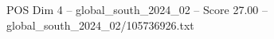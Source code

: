 \begin{textsample}{POS Dim 4 – global\_south\_2024\_02 – Score 27.00 – global\_south\_2024\_02/105736926.txt}
\end{textsample}
